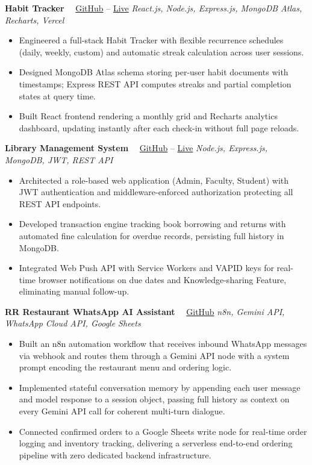 \documentclass[letterpaper,11pt]{article}
\begin{document}
\noindent\textbf{Habit Tracker} \ \
\textcolor{blue}{\href{https://github.com/Rithwik007/habit-tracker-web2}{GitHub}} -- \textcolor{blue}{\href{https://habit-tracker-web2.vercel.app/}{Live}} \hfill \textit{React.js, Node.js, Express.js, MongoDB Atlas, Recharts, Vercel}
\begin{itemize}
\item Engineered a full-stack Habit Tracker with flexible recurrence schedules (daily, weekly, custom) and automatic streak calculation across user sessions.
\item Designed MongoDB Atlas schema storing per-user habit documents with timestamps; Express REST API computes streaks and partial completion states at query time.
\item Built React frontend rendering a monthly grid and Recharts analytics dashboard, updating instantly after each check-in without full page reloads.
\end{itemize}

\noindent\textbf{Library Management System} \ \
\textcolor{blue}{\href{https://github.com/Rithwik007/Library-Management}{GitHub}} -- \textcolor{blue}{\href{https://library-management-frontend-ten-tan.vercel.app}{Live}} \hfill \textit{Node.js, Express.js, MongoDB, JWT, REST API}
\begin{itemize}
\item Architected a role-based web application (Admin, Faculty, Student) with JWT authentication and middleware-enforced authorization protecting all REST API endpoints.
\item Developed transaction engine tracking book borrowing and returns with automated fine calculation for overdue records, persisting full history in MongoDB.
\item Integrated Web Push API with Service Workers and VAPID keys for real-time browser notifications on due dates and Knowledge-sharing Feature, eliminating manual follow-up.
\end{itemize}

\noindent\textbf{RR Restaurant WhatsApp AI Assistant} \ \
\textcolor{blue}{\href{https://github.com/Rithwik007/n8n_automation_usecase}{GitHub}} \hfill \textit{n8n, Gemini API, WhatsApp Cloud API, Google Sheets}
\begin{itemize}
\item Built an n8n automation workflow that receives inbound WhatsApp messages via webhook and routes them through a Gemini API node with a system prompt encoding the restaurant menu and ordering logic.
\item Implemented stateful conversation memory by appending each user message and model response to a session object, passing full history as context on every Gemini API call for coherent multi-turn dialogue.
\item Connected confirmed orders to a Google Sheets write node for real-time order logging and inventory tracking, delivering a serverless end-to-end ordering pipeline with zero dedicated backend infrastructure.
\end{itemize}
\end{document}
